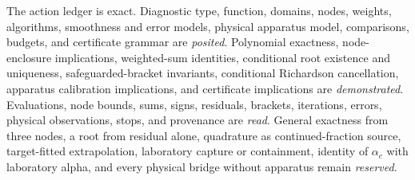 The action ledger is exact.  Diagnostic type, function, domains, nodes, weights, algorithms, smoothness and error
models, physical apparatus model, comparisons, budgets, and certificate grammar are \emph{posited}.  Polynomial
exactness, node-enclosure implications, weighted-sum identities, conditional root existence and uniqueness,
safeguarded-bracket invariants, conditional Richardson cancellation, apparatus calibration implications, and
certificate implications are \emph{demonstrated}.  Evaluations, node bounds, sums, signs, residuals, brackets,
iterations, errors, physical observations, stops, and provenance are \emph{read}.  General exactness from three
nodes, a root from residual alone, quadrature as continued-fraction source, target-fitted extrapolation, laboratory
capture or containment, identity of \(\alpha_c\) with laboratory alpha, and every physical bridge without apparatus
remain \emph{reserved}.
